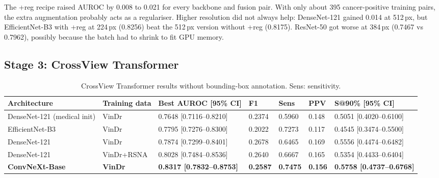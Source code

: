 \documentclass[conference]{IEEEtran}
\begin{document}
The +reg recipe raised AUROC by 0.008 to 0.021 for every backbone and fusion pair. With only about 395 cancer-positive training pairs, the extra augmentation probably acts as a regulariser. Higher resolution did not always help: DenseNet-121 gained 0.014 at 512\,px, but EfficientNet-B3 with +reg at 224\,px (0.8256) beat the 512\,px version without +reg (0.8175). ResNet-50 got worse at 384\,px (0.7467 vs 0.7962), possibly because the batch had to shrink to fit GPU memory.

\subsection{Stage 3: CrossView Transformer}

\begin{table}[!t]
\centering
\caption{CrossView Transformer results without bounding-box annotation. Sens: sensitivity.}
\label{tab:crossview}
{\small\setlength{\tabcolsep}{4pt}%
\begin{tabular}{|>{\raggedright\arraybackslash}p{}|p{}|p{}|p{}|p{}|p{}|p{}|}
\hline
\textbf{Architecture} & \textbf{Training data} & \textbf{Best AUROC [95\% CI]} & \textbf{F1} & \textbf{Sens} & \textbf{PPV} & \textbf{S@90\% [95\% CI]} \\
\hline
DenseNet-121 (medical init) & VinDr & 0.7648 [0.7116--0.8210] & 0.2374 & 0.5960 & 0.148 & 0.5051 [0.4020--0.6100] \\
\hline
EfficientNet-B3 & VinDr & 0.7795 [0.7276--0.8300] & 0.2022 & 0.7273 & 0.117 & 0.4545 [0.3474--0.5500] \\
\hline
DenseNet-121 & VinDr & 0.7874 [0.7299--0.8401] & 0.2678 & 0.6465 & 0.169 & 0.5556 [0.4474--0.6482] \\
\hline
DenseNet-121 & VinDr+RSNA & 0.8028 [0.7484--0.8536] & 0.2640 & 0.6667 & 0.165 & 0.5354 [0.4433--0.6404] \\
\hline
\textbf{ConvNeXt-Base} & \textbf{VinDr} & \textbf{0.8317 [0.7832--0.8753]} & \textbf{0.2587} & \textbf{0.7475} & \textbf{0.156} & \textbf{0.5758 [0.4737--0.6768]} \\
\hline
\end{tabular}}
\end{table}
\end{document}
